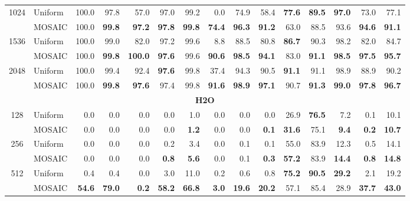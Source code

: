 \begin{table}[tp]
\begin{tabular}{@{} c l rrrrrrrrrrrrr @{}}
    \cmidrule(l){1-15}
    \multirow{2}{*}{1024} & Uniform & 100.0 & 97.8 & 57.0 & 97.0 & 99.2 & 0.0 & 74.9 & 58.4 & \textbf{77.6} & \textbf{89.5} & \textbf{97.0} & 73.0 & 77.1 \\
     & MOSAIC & 100.0 & \textbf{99.8} & \textbf{97.2} & \textbf{97.8} & \textbf{99.8} & \textbf{74.4} & \textbf{96.3} & \textbf{91.2} & 63.0 & 88.5 & 93.6 & \textbf{94.6} & \textbf{91.1} \\
    \cmidrule(l){1-15}
    \multirow{2}{*}{1536} & Uniform & 100.0 & 99.0 & 82.0 & 97.2 & 99.6 & 8.8 & 88.5 & 80.8 & \textbf{86.7} & 90.3 & 98.2 & 82.0 & 84.7 \\
     & MOSAIC & 100.0 & \textbf{99.8} & \textbf{100.0} & \textbf{97.6} & 99.6 & \textbf{90.6} & \textbf{98.5} & \textbf{94.1} & 83.0 & \textbf{91.1} & \textbf{98.5} & \textbf{97.5} & \textbf{95.7} \\
    \cmidrule(l){1-15}
    \multirow{2}{*}{2048} & Uniform & 100.0 & 99.4 & 92.4 & \textbf{97.6} & 99.8 & 37.4 & 94.3 & 90.5 & \textbf{91.1} & 91.1 & 98.9 & 88.9 & 90.2 \\
     & MOSAIC & 100.0 & \textbf{99.8} & \textbf{97.6} & 97.4 & 99.8 & \textbf{91.6} & \textbf{98.9} & \textbf{97.1} & 90.7 & \textbf{91.3} & \textbf{99.0} & \textbf{97.8} & \textbf{96.7} \\
    \midrule
    \multicolumn{15}{c}{\textbf{H2O}} \\
    \midrule
    \multirow{2}{*}{128} & Uniform & 0.0 & 0.0 & 0.0 & 0.0 & 1.0 & 0.0 & 0.0 & 0.0 & 26.9 & \textbf{76.5} & 7.2 & 0.1 & 10.1 \\
     & MOSAIC & 0.0 & 0.0 & 0.0 & 0.0 & \textbf{1.2} & 0.0 & 0.0 & \textbf{0.1} & \textbf{31.6} & 75.1 & \textbf{9.4} & \textbf{0.2} & \textbf{10.7} \\
    \cmidrule(l){1-15}
    \multirow{2}{*}{256} & Uniform & 0.0 & 0.0 & 0.0 & 0.2 & 3.4 & 0.0 & 0.1 & 0.1 & 55.0 & 83.9 & 12.3 & 0.5 & 14.1 \\
     & MOSAIC & 0.0 & 0.0 & 0.0 & \textbf{0.8} & \textbf{5.6} & 0.0 & 0.1 & \textbf{0.3} & \textbf{57.2} & 83.9 & \textbf{14.4} & \textbf{0.8} & \textbf{14.8} \\
    \cmidrule(l){1-15}
    \multirow{2}{*}{512} & Uniform & 0.4 & 0.4 & 0.0 & 3.0 & 11.0 & 0.2 & 0.6 & 0.8 & \textbf{75.2} & \textbf{90.5} & \textbf{29.2} & 2.1 & 19.2 \\
     & MOSAIC & \textbf{54.6} & \textbf{79.0} & \textbf{0.2} & \textbf{58.2} & \textbf{66.8} & \textbf{3.0} & \textbf{19.6} & \textbf{20.2} & 57.1 & 85.4 & 28.9 & \textbf{37.7} & \textbf{43.0} \\

\end{tabular}
\end{table}
